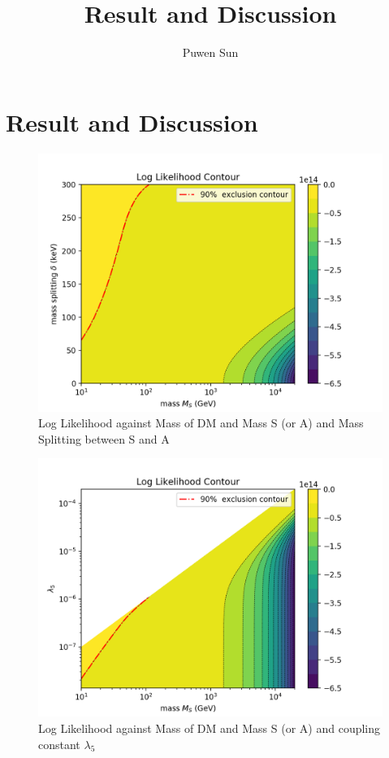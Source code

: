 \documentclass[12pt]{article}
\begin{document}
\title{Result and Discussion}
\author{Puwen Sun}
\date{}
\maketitle

\section{Result and Discussion}

\begin{figure}
 \centering
\includegraphics{figure_3.png}
\caption{Log Likelihood against Mass of DM and Mass S (or A) and Mass Splitting between S and A}\label{SDDM}
\end{figure}


\begin{figure}
 \centering
\includegraphics{figure_5.png}
\caption{Log Likelihood against Mass of DM and Mass S (or A) and coupling constant $\lambda_5$ } \label{SDDMpara}
\end{figure}
\end{document}

